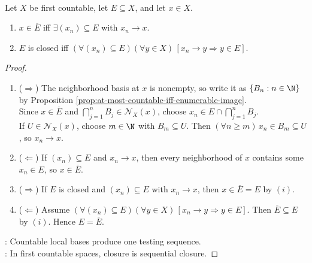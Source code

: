 \begin{proposition} \label{prop:first-countable-sequential-closure} \\
Let $X$ be first countable, let $E\subseteq X$, and let $x\in X$.
\begin{enumerate}[label=(\roman*)]
\setlength{\itemsep}{0pt}
\item $x\in\overline{E}$ iff $\exists (x_n)\subseteq E$ with $x_n\to x$.
\item $E$ is closed iff $(\forall (x_n)\subseteq E)(\forall y\in X)\,[x_n\to y\Rightarrow y\in E]$.
\end{enumerate}
\begin{proof}
\begin{enumerate}[label=(\roman*)]
\setlength{\itemsep}{0pt}
\item[$(i)$] ($\Rightarrow$) The neighborhood basis at $x$ is nonempty, so write it as $\{B_n:n\in\N\}$ by Proposition \ref{prop:at-most-countable-iff-enumerable-image}.\\
Since $x\in\overline{E}$ and $\bigcap\limits_{j=1}^n B_j\in\mathcal{N}_X(x)$, choose $x_n\in E\cap\bigcap\limits_{j=1}^n B_j$.\\
If $U\in\mathcal{N}_X(x)$, choose $m\in\N$ with $B_m\subseteq U$. Then $(\forall n\geq m)\,x_n\in B_m\subseteq U$, so $x_n\to x$.
\item[$(i)$] ($\Leftarrow$) If $(x_n)\subseteq E$ and $x_n\to x$, then every neighborhood of $x$ contains some $x_n\in E$, so $x\in\overline{E}$.
\item[$(ii)$] ($\Rightarrow$) If $E$ is closed and $(x_n)\subseteq E$ with $x_n\to x$, then $x\in\overline{E}=E$ by $(i)$.
\item[$(ii)$] ($\Leftarrow$) Assume $(\forall (x_n)\subseteq E)(\forall y\in X)\,[x_n\to y\Rightarrow y\in E]$. Then $\overline{E}\subseteq E$ by $(i)$. Hence $E=\overline{E}$.
\end{enumerate}
: Countable local bases produce one testing sequence.\\
: In first countable spaces, closure is sequential closure.
\end{proof}
\end{proposition}

